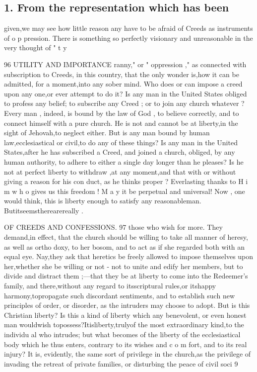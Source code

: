 \documentclass[
]{book}
\begin{document}
\hypertarget{from-the-representation-which-has-been}{%
\subsection{1. From the representation which has been}\label{from-the-representation-which-has-been}}

given,we may see how little reason any have to be afraid of Creeds as instruments of o p
pression.
There is something so perfectly visionary and unreasonable in the very thought of " t y

96 UTILITY AND IMPORTANCE
ranny," or " oppression ," as connected with
subscription to Creeds, in this country, that
the only wonder is,how it can be admitted, for a moment,into any sober mind. Who
does or can impose a creed upon any one,or ever attempt to do it? Is any man in the
United States obliged to profess any belief; to subscribe any Creed ; or to join any church
whatever ? Every man , indeed, is bound by the law of God , to believe correctly, and to connect himself with a pure church. He is
not and cannot be at liberty,in the sight of
Jehovah,to neglect either. But is any man
bound by human law,ecclesiastical or civil,to
do any of these things? Is any man in the
United States,after he has subscribed a Creed,
and joined a church, obliged, by any human
authority, to adhere to either a single day
longer than he pleases? Is he not at perfect
liberty to withdraw ,at any moment,and that
with or without giving a reason for his con duct, as he thinks proper ? Everlasting thanks
to H i m w h o gives us this freedom ! M a y it be perpetual and universal! Now , one would
think, this is liberty enough to satisfy any reasonableman. Butitseemstherearereally
.

OF CREEDS AND CONFESSIONS. 97
those who wish for more. They demand,in effect, that the church should be willing to
take all manner of heresy, as well as ortho doxy, to her bosom, and to act as if she
regarded both with an equal eye. Nay,they ask that heretics be freely allowed to impose
themselves upon her,whether she be willing or not - not to unite and edify her members, but to divide and distract them ;---that they be
at liberty to come into the Redeemer's family, and there,without any regard to itsscriptural
rules,or itshappy harmony,topropagate such discordant sentiments, and to establish such new principles of order, or disorder, as the intruders may choose to adopt. But is this Christian liberty? Is this a kind of liberty which any benevolent, or even honest man wouldwish topossess?Itisliberty,trulyof the most extraordinary kind,to the individu al who intrudes; but what becomes of the liberty of the ecclesiastical body which he thus enters, contrary to its wishes and c o m fort, and to its real injury? It is, evidently, the same sort of privilege in the church,as the privilege of invading the retreat of private families, or disturbing the peace of civil soci
9
\end{document}
